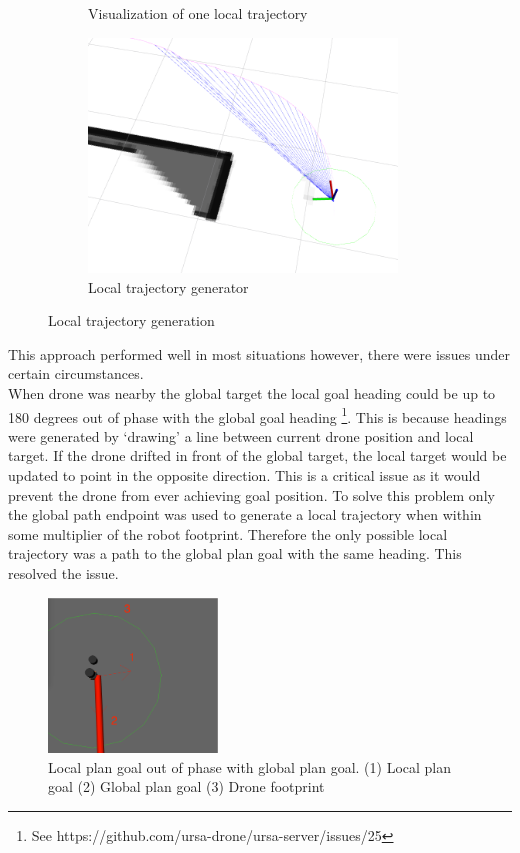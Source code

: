 \documentclass[capstone_report.tex]{subfiles}
\begin{document}
\begin{figure}[H]
\begin{subfigure}[b]{0.33\textwidth}
        \caption{Visualization of one local trajectory}
    \end{subfigure}
    \begin{subfigure}[b]{0.33\textwidth}
        \centering
        \includegraphics[width=0.9\textwidth]{imgs/local_traj_gen.png}
        \caption{Local trajectory generator}
    \end{subfigure}
    \caption{Local trajectory generation\label{fig:local_traj_gen}}
\end{figure}

This approach performed well in most situations however, there were issues under certain circumstances. \\

When drone was nearby the global target the local goal heading could be up to 180 degrees out of phase with the global goal heading \footnote{See https://github.com/ursa-drone/ursa-server/issues/25}.  This is because headings were generated by ‘drawing’ a line between current drone position and local target.  If the drone drifted in front of the global target, the local target would be updated to point in the opposite direction.  This is a critical issue as it would prevent the drone from ever achieving goal position.  To solve this problem only the global path endpoint was used to generate a local trajectory when within some multiplier of the robot footprint.  Therefore the only possible local trajectory was a path to the global plan goal with the same heading.  This resolved the issue.

\begin{figure}[H]
    \centering
    \includegraphics[width=0.4\textwidth]{imgs/out_of_phase_an.png}
    \caption{Local plan goal out of phase with global plan goal.  (1) Local plan goal (2) Global plan goal (3) Drone footprint\label{fig:lp_gp_out_of_phase}}
\end{figure}
\end{document}
